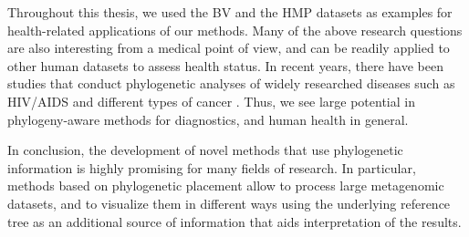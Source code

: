 Throughout this thesis, we used the \acf{BV} \cite{Srinivasan2012} and the \acf{HMP} \citep{Huttenhower2012,Methe2012}
datasets as examples for health-related applications of our methods.
Many of the above research questions are also interesting from a medical point of view,
and can be readily applied to other human datasets to assess health status.
In recent years, there have been studies that conduct phylogenetic analyses of widely researched diseases
such as HIV/AIDS \cite{Castro-Nallar2012,Brenner2013} and different types of cancer \cite{Brown2017a,Abbosh2017}.
Thus, we see large potential in phylogeny-aware methods for diagnostics, and human health in general.

In conclusion, the development of novel methods that use phylogenetic information
is highly promising for many fields of research.
In particular, methods based on phylogenetic placement allow to process large metagenomic datasets,
and to visualize them in different ways using the underlying reference tree as an additional source
of information that aids interpretation of the results.
